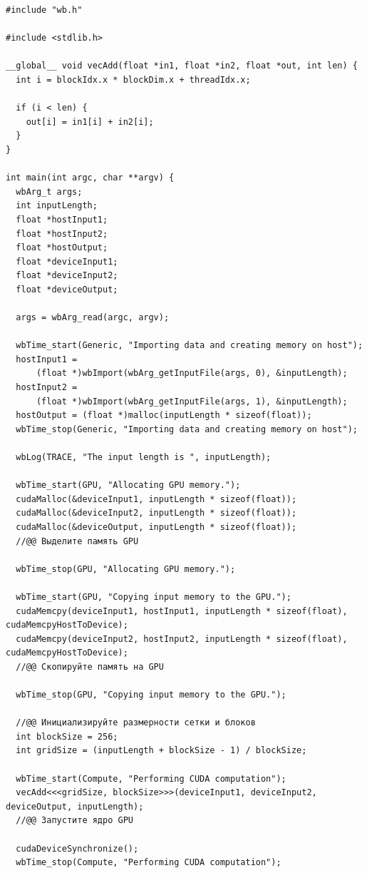 \documentclass[14pt]{extarticle}
\newenvironment{code}{\captionsetup{type=listing, belowskip=-14pt plus 3pt minus 0pt}}{}
\begin{document}
\begin{code}    
\caption{Содержание rvs\_laboratories\_1/main.cu\label{lst:main}}
\begin{verbatim}
#include "wb.h"

#include <stdlib.h>

__global__ void vecAdd(float *in1, float *in2, float *out, int len) {
  int i = blockIdx.x * blockDim.x + threadIdx.x;

  if (i < len) {
    out[i] = in1[i] + in2[i];
  }
}

int main(int argc, char **argv) {
  wbArg_t args;
  int inputLength;
  float *hostInput1;
  float *hostInput2;
  float *hostOutput;
  float *deviceInput1;
  float *deviceInput2;
  float *deviceOutput;

  args = wbArg_read(argc, argv);

  wbTime_start(Generic, "Importing data and creating memory on host");
  hostInput1 =
      (float *)wbImport(wbArg_getInputFile(args, 0), &inputLength);
  hostInput2 =
      (float *)wbImport(wbArg_getInputFile(args, 1), &inputLength);
  hostOutput = (float *)malloc(inputLength * sizeof(float));
  wbTime_stop(Generic, "Importing data and creating memory on host");

  wbLog(TRACE, "The input length is ", inputLength);

  wbTime_start(GPU, "Allocating GPU memory.");
  cudaMalloc(&deviceInput1, inputLength * sizeof(float));
  cudaMalloc(&deviceInput2, inputLength * sizeof(float));
  cudaMalloc(&deviceOutput, inputLength * sizeof(float));
  //@@ Выделите память GPU

  wbTime_stop(GPU, "Allocating GPU memory.");

  wbTime_start(GPU, "Copying input memory to the GPU.");
  cudaMemcpy(deviceInput1, hostInput1, inputLength * sizeof(float), cudaMemcpyHostToDevice);
  cudaMemcpy(deviceInput2, hostInput2, inputLength * sizeof(float), cudaMemcpyHostToDevice);
  //@@ Скопируйте память на GPU

  wbTime_stop(GPU, "Copying input memory to the GPU.");

  //@@ Инициализируйте размерности сетки и блоков
  int blockSize = 256;
  int gridSize = (inputLength + blockSize - 1) / blockSize;

  wbTime_start(Compute, "Performing CUDA computation");
  vecAdd<<<gridSize, blockSize>>>(deviceInput1, deviceInput2, deviceOutput, inputLength);
  //@@ Запустите ядро GPU

  cudaDeviceSynchronize();
  wbTime_stop(Compute, "Performing CUDA computation");


\end{verbatim}
\end{code}
\end{document}
